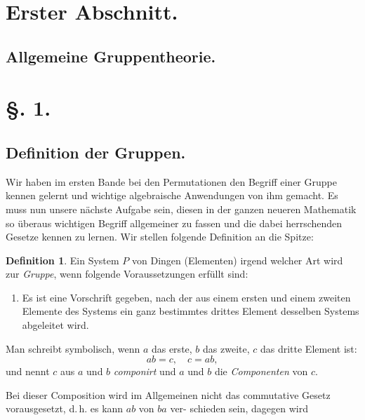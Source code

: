\documentclass[12pt,a4paper]{article}
\theoremstyle{plain}
\theoremstyle{definition}
\newtheorem{definition}{Definition}[section]
\theoremstyle{remark}
\begin{document}
\section{Erster Abschnitt.}
\subsection*{Allgemeine Gruppentheorie.}

\setcounter{section}{1}
\setcounter{subsection}{0}

\section*{\S. 1.}
\subsection*{Definition der Gruppen.}

Wir haben im ersten Bande bei den Permutationen den
Begriff einer Gruppe kennen gelernt und wichtige algebraische
Anwendungen von ihm gemacht. Es muss nun unsere nächste
Aufgabe sein, diesen in der ganzen neueren Mathematik so
überaus wichtigen Begriff allgemeiner zu fassen und die dabei
herrschenden Gesetze kennen zu lernen. Wir stellen folgende
Definition an die Spitze:

\begin{definition}
Ein System $P$ von Dingen (Elementen) irgend welcher Art
wird zur \emph{Gruppe}, wenn folgende Voraussetzungen erfüllt sind:

\begin{enumerate}[label=\arabic*.]
\item Es ist eine Vorschrift gegeben, nach der aus
einem ersten und einem zweiten Elemente des
Systems ein ganz bestimmtes drittes Element
desselben Systems abgeleitet wird.
\end{enumerate}
\end{definition}

Man schreibt symbolisch, wenn $a$ das erste, $b$ das zweite,
$c$ das dritte Element ist:
\[
ab = c, \quad c = ab,
\]
und nennt $c$ aus $a$ und $b$ \emph{componirt} und $a$ und $b$ die \emph{Componenten} von $c$.

Bei dieser Composition wird im Allgemeinen nicht das
commutative Gesetz vorausgesetzt, d.\,h. es kann $ab$ von $ba$ ver-
schieden sein, dagegen wird
\end{document}
